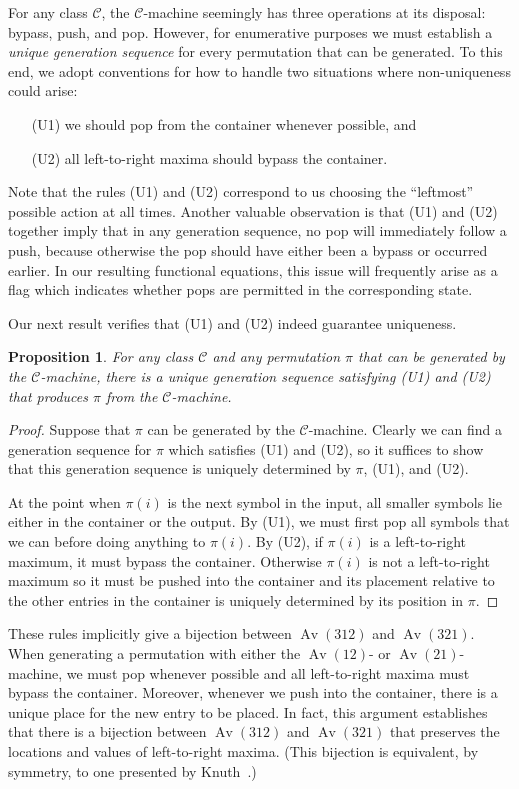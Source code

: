 \documentclass[10pt]{article}
\theoremstyle{plain}
\newtheorem{proposition}[theorem]{Proposition}
\theoremstyle{definition}
\newcommand{\Av}{\operatorname{Av}}
\newcommand{\C}{\mathcal{C}}
\begin{document}
For any class $\C$, the $\C$-machine seemingly has three operations at its disposal: bypass, push, and pop. However, for enumerative purposes we must establish a \emph{unique generation sequence} for every permutation that can be generated. To this end, we adopt conventions for how to handle two situations where non-uniqueness could arise:
\begin{enumerate}
\item[(U1)] we should pop from the container whenever possible, and
\item[(U2)] all left-to-right maxima should bypass the container.
\end{enumerate}
Note that the rules (U1) and (U2) correspond to us choosing the ``leftmost'' possible action at all times. Another valuable observation is that (U1) and (U2) together imply that in any generation sequence, no pop will immediately follow a push, because otherwise the pop should have either been a bypass or occurred earlier. In our resulting functional equations, this issue will frequently arise as a flag which indicates whether pops are permitted in the corresponding state.

Our next result verifies that (U1) and (U2) indeed guarantee uniqueness.

\begin{proposition}
\label{prop-uniqueness}
For any class $\C$ and any permutation $\pi$ that can be generated by the $\C$-machine, there is a unique generation sequence satisfying (U1) and (U2) that produces $\pi$ from the $\C$-machine.
\end{proposition}
\begin{proof}
Suppose that $\pi$ can be generated by the $\C$-machine. Clearly we can find a generation sequence for $\pi$ which satisfies (U1) and (U2), so it suffices to show that this generation sequence is uniquely determined by $\pi$, (U1), and (U2).

At the point when $\pi(i)$ is the next symbol in the input, all smaller symbols lie either in the container or the output. By (U1), we must first pop all symbols that we can before doing anything to $\pi(i)$. By (U2), if $\pi(i)$ is a left-to-right maximum, it must bypass the container. Otherwise $\pi(i)$ is not a left-to-right maximum so it must be pushed into the container and its placement relative to the other entries in the container is uniquely determined by its position in $\pi$.
\end{proof}

These rules implicitly give a bijection between $\Av(312)$ and $\Av(321)$. When generating a permutation with either the $\Av(12)$- or $\Av(21)$-machine, we must pop whenever possible and all left-to-right maxima must bypass the container. Moreover, whenever we push into the container, there is a unique place for the new entry to be placed. In fact, this argument establishes that there is a bijection between $\Av(312)$ and $\Av(321)$ that preserves the locations and values of left-to-right maxima. (This bijection is equivalent, by symmetry, to one presented by Knuth~\cite{knuth:the-art-of-comp:1}.)
\end{document}
